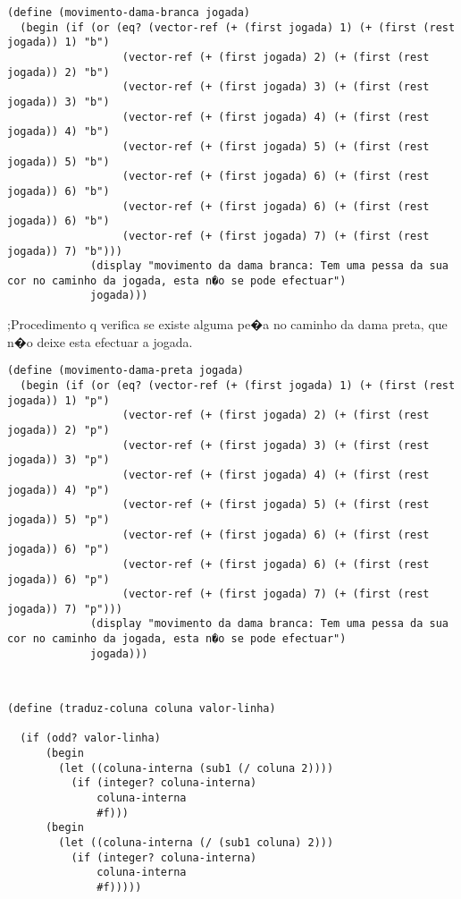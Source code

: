 \begin{lstlisting}[basicstyle=\ttfamily, caption="example"]
             (define (movimento-dama-branca jogada)
  (begin (if (or (eq? (vector-ref (+ (first jogada) 1) (+ (first (rest jogada)) 1) "b")
                  (vector-ref (+ (first jogada) 2) (+ (first (rest jogada)) 2) "b")
                  (vector-ref (+ (first jogada) 3) (+ (first (rest jogada)) 3) "b")
                  (vector-ref (+ (first jogada) 4) (+ (first (rest jogada)) 4) "b")
                  (vector-ref (+ (first jogada) 5) (+ (first (rest jogada)) 5) "b")
                  (vector-ref (+ (first jogada) 6) (+ (first (rest jogada)) 6) "b")
                  (vector-ref (+ (first jogada) 6) (+ (first (rest jogada)) 6) "b")
                  (vector-ref (+ (first jogada) 7) (+ (first (rest jogada)) 7) "b")))
             (display "movimento da dama branca: Tem uma pessa da sua cor no caminho da jogada, esta n�o se pode efectuar")
             jogada)))
\end{lstlisting}

;Procedimento q verifica se existe alguma pe�a no caminho da dama preta, que n�o deixe esta efectuar a jogada.
\begin{lstlisting}[basicstyle=\ttfamily, caption="example"]
(define (movimento-dama-preta jogada)
  (begin (if (or (eq? (vector-ref (+ (first jogada) 1) (+ (first (rest jogada)) 1) "p")
                  (vector-ref (+ (first jogada) 2) (+ (first (rest jogada)) 2) "p")
                  (vector-ref (+ (first jogada) 3) (+ (first (rest jogada)) 3) "p")
                  (vector-ref (+ (first jogada) 4) (+ (first (rest jogada)) 4) "p")
                  (vector-ref (+ (first jogada) 5) (+ (first (rest jogada)) 5) "p")
                  (vector-ref (+ (first jogada) 6) (+ (first (rest jogada)) 6) "p")
                  (vector-ref (+ (first jogada) 6) (+ (first (rest jogada)) 6) "p")
                  (vector-ref (+ (first jogada) 7) (+ (first (rest jogada)) 7) "p")))
             (display "movimento da dama branca: Tem uma pessa da sua cor no caminho da jogada, esta n�o se pode efectuar")
             jogada)))
\end{lstlisting}
\begin{lstlisting}[basicstyle=\ttfamily, caption="example"]

\end{lstlisting}
\begin{lstlisting}[basicstyle=\ttfamily, caption="example"]

(define (traduz-coluna coluna valor-linha)

  (if (odd? valor-linha)
      (begin
        (let ((coluna-interna (sub1 (/ coluna 2))))
          (if (integer? coluna-interna)
              coluna-interna
              #f)))
      (begin
        (let ((coluna-interna (/ (sub1 coluna) 2)))
          (if (integer? coluna-interna)
              coluna-interna
              #f)))))
\end{lstlisting}


